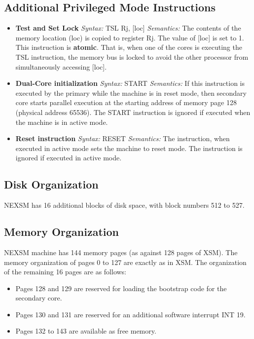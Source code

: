 \documentclass[12pt]{report}
\begin{document}
\subsection{Additional Privileged Mode Instructions}
\begin{itemize}
    \item{\textbf{Test and Set Lock}
    \newline \emph{Syntax:} TSL Rj, [loc]
    \newline \emph{Semantics:} The contents of the memory location (loc) is copied to register Rj. The value of [loc] is set to 1. This instruction is \textbf{atomic}. That is, when one of the cores is executing the TSL instruction, the memory bus is locked to avoid the other processor from simultaneously accessing [loc].}
    
    \item{\textbf{Dual-Core initialization}
    \newline \emph{Syntax:} START
    \newline \emph{Semantics:} If this instruction is executed by the primary while the machine is in reset mode, then secondary core starts parallel execution at the starting address of memory page 128 (physical address 65536). The START instruction is ignored if executed when the machine is in active mode.}
    
    \item{\textbf{Reset instruction}
    \newline \emph{Syntax:} RESET
    \newline \emph{Semantics:} The instruction, when executed in active mode sets the machine to reset mode.  The instruction is ignored if executed in active mode.}
\end{itemize}

\subsection{Disk Organization}
NEXSM has 16 additional blocks of disk space, with block numbers 512 to 527.

\subsection{Memory Organization}
NEXSM machine has 144 memory pages (as against 128 pages of XSM). The memory organization of pages 0 to 127 are exactly as in XSM. The organization of the remaining 16 pages are as follows:
\begin{itemize}
    \item Pages 128 and 129 are reserved for loading the bootstrap code for the secondary core.
    \item Pages 130 and 131 are reserved for an additional software interrupt INT 19.
    \item Pages 132 to 143 are available as free memory.
\end{itemize}
\end{document}
